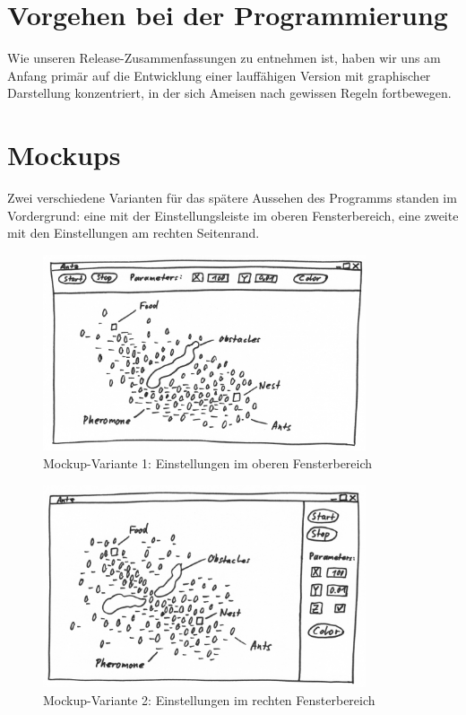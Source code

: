 \section{Vorgehen bei der Programmierung}

Wie unseren Release-Zusammenfassungen zu entnehmen ist, haben wir uns am Anfang primär auf die Entwicklung einer lauffähigen Version mit graphischer Darstellung konzentriert, in der sich Ameisen nach gewissen Regeln fortbewegen. 

\section{Mockups}

Zwei verschiedene Varianten für das spätere Aussehen des Programms standen im Vordergrund: eine mit der Einstellungsleiste im oberen Fensterbereich, eine zweite mit den Einstellungen am rechten Seitenrand.

\begin{figure}[h]
  \centering
	\includegraphics [width=0.85\textwidth]{images/Antz_Mockup_1_sw.png} 
	\caption{Mockup-Variante 1: Einstellungen im oberen Fensterbereich}
\end{figure}

\begin{figure}[h]
  \centering
	\includegraphics [width=0.85\textwidth]{images/Antz_Mockup_2_sw.png} 
	\caption{Mockup-Variante 2: Einstellungen im rechten Fensterbereich}
\end{figure}

